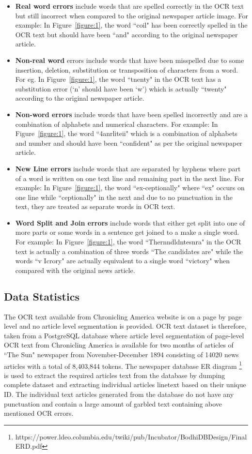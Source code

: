 \begin{itemize}
 \item \textbf{Real word errors}	 include words that are spelled correctly in the OCR text but still incorrect when compared to the original newspaper article image. For example: In Figure~\ref{figure:1}, the word ``coil"  has been correctly spelled in the OCR text  but should have been ``and" according to the original newspaper article. 
 \item \textbf{Non-real word} errors include words that have been misspelled due to some insertion, deletion, substitution or transposition of characters from a word. For eg. In Figure~\ref{figure:1}, the word ``tnenty" in the OCR text has a substitution error (`n' should have been `w') which is actually ``twenty" according to the original newspaper article.
 \item \textbf{Non-word errors} include words that have been spelled incorrectly and are a combination of alphabets and numerical characters. For example: In Figure~\ref{figure:1}, the word ``4anrliteii" which is a combination of alphabets and number and should have been ``confident" as per the original newspaper article.
\item \textbf{New Line errors} include words that are separated by hyphens where part of a word is written on one text line and remaining part in the next line. For example: In Figure~\ref{figure:1}, the word ``ex-ceptionally" where ``ex" occurs on one line while ``ceptionally" in the next and due to no punctuation in the text, they are treated as separate words in OCR text.
\item \textbf{Word Split and Join errors} include words that either get split into one of more parts or some words in a sentence get joined to a make a single word. For example: In Figure~\ref{figure:1}, the word ``Thernndldntesnra" in the OCR text is actually a combination of three words ``The candidates are" while the words ``v Icrory" are actually equivalent to a single word ``victory" when compared with the original news article.
\end{itemize} 

\subsection{Data Statistics}
The OCR text available from Chronicling America website is on a page by page level and no article level segmentation is provided. OCR text dataset is therefore, taken from a PostgreSQL database where article level segmentation of page-level OCR text from Chronicling America is available for two months of articles of ``The Sun" newspaper from November-December 1894 consisting of 14020 news articles with a total of 8,403,844 tokens. The newspaper database ER diagram \footnote{https://power.ldeo.columbia.edu/twiki/pub/Incubator/BodhiDBDesign/Final ERD.pdf }
is used to extract the required articles text from the database by dumping complete dataset and extracting individual articles linetext based on their unique ID. The individual text articles generated from the database do not have any punctuation and contain a large amount of garbled text containing above mentioned OCR errors.


